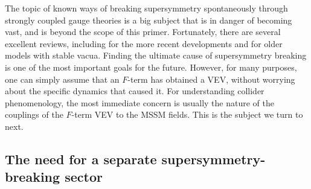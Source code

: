 \documentclass[12pt]{article}
\begin{document}
The topic of known ways of breaking supersymmetry spontaneously through
strongly coupled gauge theories is a big subject that is in danger of becoming vast, and is beyond 
the scope of this primer. Fortunately,
there are several excellent reviews, including 
\cite{susybreakingrevs} for the more recent developments and \cite{dynamicalsusybreaking}
for older models with stable vacua.
Finding the ultimate cause of supersymmetry breaking is one of the
most important goals for the future. However, for many purposes,
one can simply assume that an $F$-term has obtained a VEV, without
worrying about the specific dynamics that caused it. For
understanding collider phenomenology, the most immediate concern is usually
the nature of the couplings of the $F$-term VEV to the MSSM fields. 
This is the subject we turn to next.


\subsection{The need for a separate supersymmetry-breaking sector
\label{subsec:origins.sector}}
\setcounter{equation}{0}
\setcounter{footnote}{1}
\end{document}
